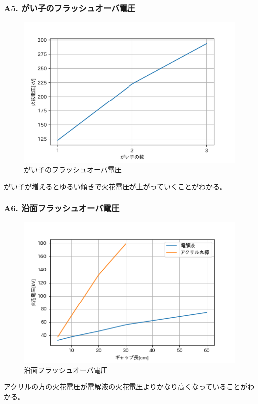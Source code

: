 \documentclass[dvipdfmx, twocolumn]{jsarticle}
\begin{document}
\subsubsection*{A5. がい子のフラッシュオーバ電圧}

\begin{figure}[H]
\begin{center}
\includegraphics[scale = 0.5]{A5.png}
\caption{がい子のフラッシュオーバ電圧}
\end{center}
\end{figure}
がい子が増えるとゆるい傾きで火花電圧が上がっていくことがわかる。

\subsubsection*{A6. 沿面フラッシュオーバ電圧}

\begin{figure}[H]
\begin{center}
\includegraphics[scale = 0.5]{A6.png}
\caption{沿面フラッシュオーバ電圧}
\end{center}
\end{figure}
アクリルの方の火花電圧が電解液の火花電圧よりかなり高くなっていることがわかる。
\end{document}
